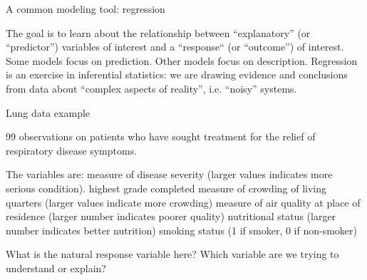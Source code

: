 \documentclass[table]{beamer}\usepackage[]{graphicx}\usepackage[]{color}
\begin{document}

\begin{frame}{A common modeling tool: regression}

\bi
        \myitem The goal is to learn about the relationship between ``explanatory'' (or ``predictor'') variables of interest and a ``response`` (or  ``outcome'') of interest.
	\bi
		\myitem Some models focus on prediction.
		\myitem Other models focus on description.
	\ei
	\myitem Regression is an exercise in inferential statistics: we are drawing evidence and conclusions from data about ``complex aspects of reality'', i.e. ``noisy'' systems.
\ei


\end{frame}




\begin{frame}[t]{Lung data example}

99 observations on patients who have sought treatment for the relief of respiratory disease symptoms. 

The variables are:
\bi
     measure of disease severity (larger values indicates more serious condition).
     highest grade completed
     measure of crowding of living quarters (larger values indicate more crowding)
     measure of air quality at place of residence (larger number indicates poorer quality)
     nutritional status (larger number indicates better nutrition)
     smoking status (1 if smoker, 0 if non-smoker)
\ei

What is the natural response variable here? Which variable are we trying to understand or explain?

\end{frame}


\end{document}
